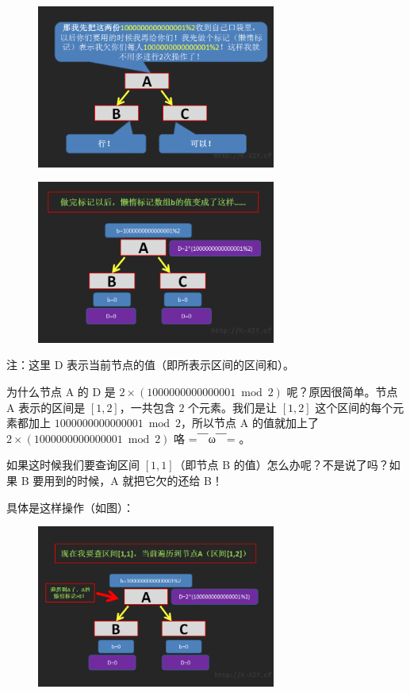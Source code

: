 \begin{figure}[htbp]
\centering
\includegraphics[width=0.7\textwidth]{docs/ds/images/segt11.png} 

\end{figure}

\begin{figure}[htbp]
\centering
\includegraphics[width=0.7\textwidth]{docs/ds/images/segt12.png} 

\end{figure}

注：这里 D 表示当前节点的值（即所表示区间的区间和）。

为什么节点 A 的 D 是 $2\times (1000000000000001\bmod 2)$ 呢？原因很简单。节点 A 表示的区间是 $[1,2]$，一共包含 $2$ 个元素。我们是让 $[1,2]$ 这个区间的每个元素都加上 $1000000000000001\bmod 2$，所以节点 A 的值就加上了 $2\times (1000000000000001\bmod 2)$ 咯 =￣ω￣= 。

如果这时候我们要查询区间 $[1,1]$（即节点 B 的值）怎么办呢？不是说了吗？如果 B 要用到的时候，A 就把它欠的还给 B！

具体是这样操作（如图）：

\begin{figure}[htbp]
\centering
\includegraphics[width=0.7\textwidth]{docs/ds/images/segt13.png} 

\end{figure}

